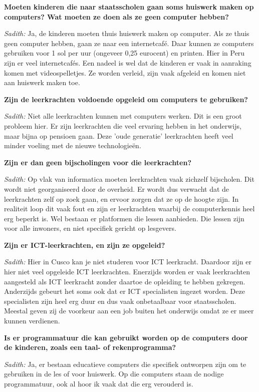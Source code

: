 \textbf{Moeten kinderen die naar staatsscholen gaan soms huiswerk maken op computers? Wat moeten ze doen als ze geen computer hebben?}

\textit{Sadith:} Ja, de kinderen moeten thuis huiswerk maken op computer. Als ze thuis geen computer hebben, gaan ze naar een internetcafé. Daar kunnen ze computers gebruiken voor 1 sol per uur (ongeveer 0,25 eurocent) en printen. Hier in Peru zijn er veel internetcafés. Een nadeel is wel dat de kinderen er vaak in aanraking komen met videospelletjes. Ze worden verleid, zijn vaak afgeleid en komen niet aan huiswerk maken toe. 

\textbf{Zijn de leerkrachten voldoende opgeleid om computers te gebruiken?}

\textit{Sadith:} Niet alle leerkrachten kunnen met computers werken. Dit is een groot probleem hier. Er zijn leerkrachten die veel ervaring hebben in het onderwijs, maar bijna op pensioen gaan. Deze 'oude generatie' leerkrachten heeft veel minder voeling met de nieuwe technologieën.

\textbf{Zijn er dan geen bijscholingen voor die leerkrachten?}

\textit{Sadith:} Op vlak van informatica moeten leerkrachten vaak zichzelf bijscholen. Dit wordt niet georganiseerd door de overheid. Er wordt dus verwacht dat de leerkrachten zelf op zoek gaan, en ervoor zorgen dat ze op de hoogte zijn. In realiteit loop dit vaak fout en zijn er leerkrachten waarbij de computerkennis heel erg beperkt is. Wel bestaan er platformen die lessen aanbieden. Die lessen zijn voor alle inwoners, en niet specifiek gericht op lesgevers.

\textbf{Zijn er ICT-leerkrachten, en zijn ze opgeleid?}

\textit{Sadith:} Hier in Cusco kan je niet studeren voor ICT leerkracht. Daardoor zijn er hier niet veel opgeleide ICT leerkrachten. Enerzijds worden er vaak leerkrachten aangesteld als ICT leerkracht zonder daartoe de opleiding te hebben gekregen. Anderzijds gebeurt het soms ook dat er ICT specialisten ingezet worden. Deze specialisten zijn heel erg duur en dus vaak onbetaalbaar voor staatsscholen. Meestal geven zij de voorkeur aan een job buiten het onderwijs omdat ze er meer kunnen verdienen. 

\textbf{Is er programmatuur die kan gebruikt worden op de computers door de kinderen, zoals een taal- of rekenprogramma?}

\textit{Sadith:} Ja, er bestaan educatieve computers die specifiek ontworpen zijn om te gebruiken in de les of voor huiswerk. Op die computers staan de nodige programmatuur, ook al hoor ik vaak dat die erg verouderd is.
	
